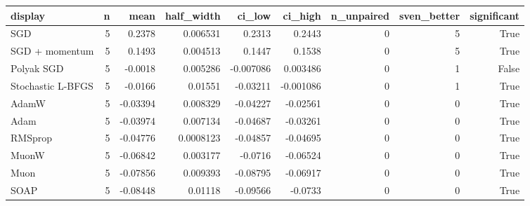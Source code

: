 \begin{tabular}{lrrrrrrrr}
\toprule
display & n & mean & half\_width & ci\_low & ci\_high & n\_unpaired & sven\_better & significant \\
\midrule
SGD & 5 & 0.2378 & 0.006531 & 0.2313 & 0.2443 & 0 & 5 & True \\
SGD + momentum & 5 & 0.1493 & 0.004513 & 0.1447 & 0.1538 & 0 & 5 & True \\
Polyak SGD & 5 & -0.0018 & 0.005286 & -0.007086 & 0.003486 & 0 & 1 & False \\
Stochastic L-BFGS & 5 & -0.0166 & 0.01551 & -0.03211 & -0.001086 & 0 & 1 & True \\
AdamW & 5 & -0.03394 & 0.008329 & -0.04227 & -0.02561 & 0 & 0 & True \\
Adam & 5 & -0.03974 & 0.007134 & -0.04687 & -0.03261 & 0 & 0 & True \\
RMSprop & 5 & -0.04776 & 0.0008123 & -0.04857 & -0.04695 & 0 & 0 & True \\
MuonW & 5 & -0.06842 & 0.003177 & -0.0716 & -0.06524 & 0 & 0 & True \\
Muon & 5 & -0.07856 & 0.009393 & -0.08795 & -0.06917 & 0 & 0 & True \\
SOAP & 5 & -0.08448 & 0.01118 & -0.09566 & -0.0733 & 0 & 0 & True \\
\bottomrule
\end{tabular}

